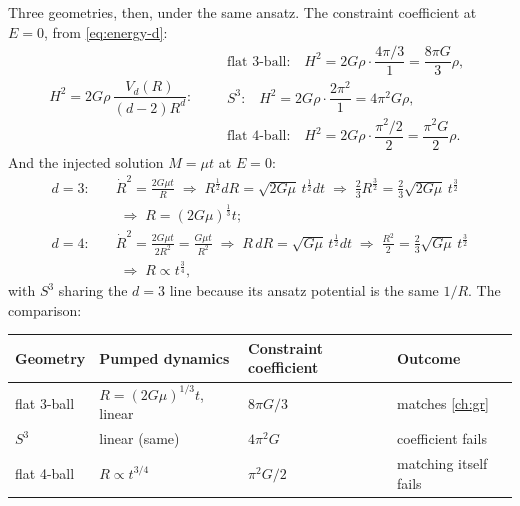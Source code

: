 \documentclass[11pt]{amsbook}
\theoremstyle{plain}
\theoremstyle{definition}
\theoremstyle{remark}
\begin{document}
Three geometries, then, under the same ansatz. The constraint coefficient at $E = 0$, from \cref{eq:energy-d}:
\begin{equation}\label{eq:coefficients}
H^{2} = 2 G \rho\, \frac{V_{d}(R)}{(d-2)R^{d}}:
\qquad
\begin{array}{l}
\text{flat 3-ball:} \quad H^{2} = 2G\rho\cdot\dfrac{4\pi/3}{1} = \dfrac{8\pi G}{3}\rho,\\[10pt]
\text{$S^{3}$:} \quad H^{2} = 2G\rho\cdot\dfrac{2\pi^{2}}{1} = 4\pi^{2} G\rho,\\[10pt]
\text{flat 4-ball:} \quad H^{2} = 2G\rho\cdot\dfrac{\pi^{2}/2}{2} = \dfrac{\pi^{2} G}{2}\rho.
\end{array}
\end{equation}
And the injected solution $M = \mu t$ at $E = 0$:
\begin{equation}\label{eq:pumped-d}
\begin{aligned}
d = 3:\quad & \dot R^{2} = \frac{2G\mu t}{R} \;\Longrightarrow\; R^{\frac12} dR = \sqrt{2G\mu}\,t^{\frac12} dt
\;\Longrightarrow\; \tfrac{2}{3}R^{\frac32} = \tfrac{2}{3}\sqrt{2G\mu}\,t^{\frac32}\\
& \;\Longrightarrow\; R = (2G\mu)^{\frac13} t;\\
d = 4:\quad & \dot R^{2} = \frac{2G\mu t}{2R^{2}} = \frac{G\mu t}{R^{2}} \;\Longrightarrow\; R\,dR = \sqrt{G\mu}\,t^{\frac12} dt
\;\Longrightarrow\; \tfrac{R^{2}}{2} = \tfrac{2}{3}\sqrt{G\mu}\,t^{\frac32}\\
& \;\Longrightarrow\; R \propto t^{\frac34},
\end{aligned}
\end{equation}
with $S^{3}$ sharing the $d = 3$ line because its ansatz potential is the same $1/R$. The comparison:
\begin{center}
\begin{tabular}{@{}llll@{}}
\toprule
Geometry & Pumped dynamics & Constraint coefficient & Outcome \\
\midrule
flat 3-ball & $R = (2G\mu)^{1/3}t$, linear & $8\pi G/3$ & matches \cref{ch:gr} \\
$S^{3}$ & linear (same) & $4\pi^{2} G$ & coefficient fails \\
flat 4-ball & $R \propto t^{3/4}$ & $\pi^{2}G/2$ & matching itself fails \\
\bottomrule
\end{tabular}
\end{center}
\end{document}
